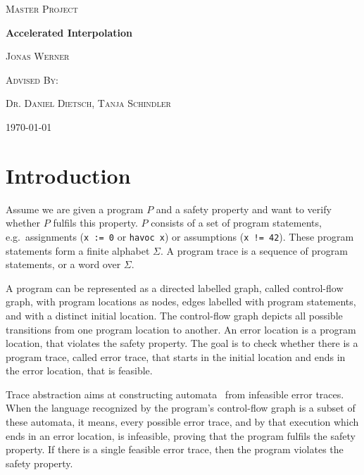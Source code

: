 \documentclass{article}
\newcommand\mycom[1]{}
\newcommand\mycom[1]{#1}
\newcommand{\dd}[1]{\mycom{\todo[color=orange!40,inline]{\small DD: #1}}}
\newcommand{\ts}[1]{\mycom{\todo[color=green!40,inline]{\small TS: #1}}}
\begin{document}
    \newcommand{\HorizontalLine}{\rule{\linewidth}{0.3mm}}
    
        \begin{center}
        {\scshape\Large Master Project \par}
        \vspace{1.5cm}
        {\huge\bfseries Accelerated Interpolation \par}
        \vspace{1cm}
        {\large \scshape Jonas Werner\par}
        \vspace{0.5cm}
        {\large \scshape Advised By: \par}
        {\large \scshape Dr. Daniel Dietsch, Tanja Schindler \par}
        \vspace{0.5cm}
        {\today \vspace{2cm}} 
        \end{center}

\section{Introduction}
Assume we are given a program $P$ and a safety property and want to verify whether $P$ fulfils this property. 
$P$ consists of a set of program statements, e.g.\ assignments (\texttt{x := 0} or \texttt{havoc x}) or assumptions (\texttt{x != 42}).
These program statements form a finite alphabet $\Sigma$. 
A program trace is a sequence of program statements, or a word over $\Sigma$.

A program can be represented as a directed labelled graph, called control-flow graph, with program locations as nodes, edges labelled with program statements, and with a distinct initial location. 
The control-flow graph depicts all possible transitions from one program location to another. 
An error location is a program location, that violates the safety property.\ts{How does a location violate a property? Explain error location. In the beginning, you are given a program and a safety property - how is this connected to the error location?} 
The goal is to check whether there is a program trace, called error trace, that starts in the initial location and ends in the error location, that is feasible. 

Trace abstraction aims at constructing automata~\cite{10.1007/978-3-642-39799-8_2} from infeasible error traces. \dd{Is this a good description of TA?}
When the language recognized by the program's control-flow graph\dd{How can a graph recognize a language?} is a subset of these automata, it means, every possible error trace, and by that execution which ends in an error location, is infeasible\dd{what is an infeasible execution?}, proving that the program fulfils the safety property. 
If there is a single feasible error trace, then the program violates the safety property.\dd{what is another word for feasible? Usually, we need to define (in)feasability before using it, so if you can find a better one the intro up to this point will make more sense}
\end{document}
